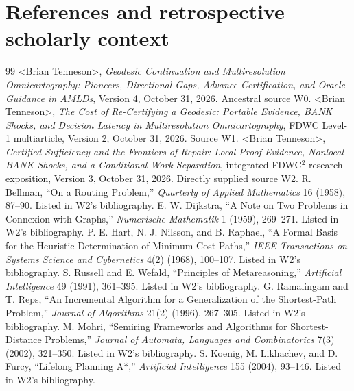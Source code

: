 \documentclass[11pt,letterpaper]{article}
\begin{document}
\section*{References and retrospective scholarly context}
\begin{thebibliography}{99}\small
{} \textless Brian Tenneson\textgreater, \emph{Geodesic Continuation and Multiresolution Omnicartography: Pioneers, Directional Gaps, Advance Certification, and Oracle Guidance in AMLDs}, Version 4, October 31, 2026. Ancestral source W0.
 \textless Brian Tenneson\textgreater, \emph{The Cost of Re-Certifying a Geodesic: Portable Evidence, BANK Shocks, and Decision Latency in Multiresolution Omnicartography}, FDWC Level-1 multiarticle, Version 2, October 31, 2026. Source W1.
 \textless Brian Tenneson\textgreater, \emph{Certified Sufficiency and the Frontiers of Repair: Local Proof Evidence, Nonlocal BANK Shocks, and a Conditional Work Separation}, integrated FDWC$^2$ research exposition, Version 3, October 31, 2026. Directly supplied source W2.
 R. Bellman, ``On a Routing Problem,'' \emph{Quarterly of Applied Mathematics} 16 (1958), 87--90. Listed in W2's bibliography.
 E. W. Dijkstra, ``A Note on Two Problems in Connexion with Graphs,'' \emph{Numerische Mathematik} 1 (1959), 269--271. Listed in W2's bibliography.
 P. E. Hart, N. J. Nilsson, and B. Raphael, ``A Formal Basis for the Heuristic Determination of Minimum Cost Paths,'' \emph{IEEE Transactions on Systems Science and Cybernetics} 4(2) (1968), 100--107. Listed in W2's bibliography.
 S. Russell and E. Wefald, ``Principles of Metareasoning,'' \emph{Artificial Intelligence} 49 (1991), 361--395. Listed in W2's bibliography.
 G. Ramalingam and T. Reps, ``An Incremental Algorithm for a Generalization of the Shortest-Path Problem,'' \emph{Journal of Algorithms} 21(2) (1996), 267--305. Listed in W2's bibliography.
 M. Mohri, ``Semiring Frameworks and Algorithms for Shortest-Distance Problems,'' \emph{Journal of Automata, Languages and Combinatorics} 7(3) (2002), 321--350. Listed in W2's bibliography.
 S. Koenig, M. Likhachev, and D. Furcy, ``Lifelong Planning A*,'' \emph{Artificial Intelligence} 155 (2004), 93--146. Listed in W2's bibliography.


\end{thebibliography}
\end{document}

